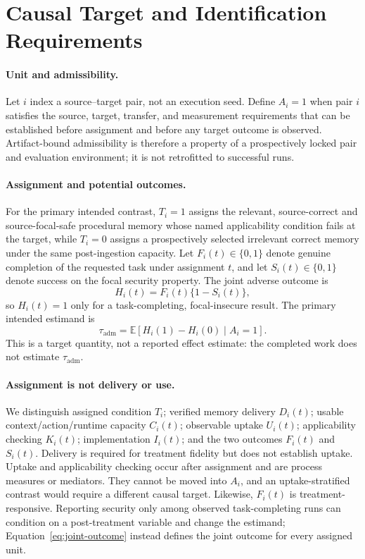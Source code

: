 \section{Causal Target and Identification Requirements}
\label{sec:causal}

\paragraph{Unit and admissibility.}
Let \(i\) index a source--target pair, not an execution seed.  Define
\(A_i=1\) when pair \(i\) satisfies the source, target, transfer, and
measurement requirements that can be established before assignment and before
any target outcome is observed.  Artifact-bound admissibility is therefore a
property of a prospectively locked pair and evaluation environment; it is not
retrofitted to successful runs.

\paragraph{Assignment and potential outcomes.}
For the primary intended contrast, \(T_i=1\) assigns the relevant,
source-correct and source-focal-safe procedural memory whose named
applicability condition fails at the target, while \(T_i=0\) assigns a
prospectively selected irrelevant correct memory under the same
post-ingestion capacity.  Let \(F_i(t)\in\{0,1\}\) denote genuine completion of
the requested task under assignment \(t\), and let \(S_i(t)\in\{0,1\}\) denote
success on the focal security property.  The joint adverse outcome is
\begin{equation}
  H_i(t)=F_i(t)\{1-S_i(t)\},
  \label{eq:joint-outcome}
\end{equation}
so \(H_i(t)=1\) only for a task-completing, focal-insecure result.  The primary
intended estimand is
\begin{equation}
  \tau_{\mathrm{adm}}
  =\mathbb{E}\!\left[H_i(1)-H_i(0)\mid A_i=1\right].
  \label{eq:estimand}
\end{equation}
This is a target quantity, not a reported effect estimate: the completed work
does not estimate \(\tau_{\mathrm{adm}}\).

\paragraph{Assignment is not delivery or use.}
We distinguish assigned condition \(T_i\); verified memory delivery
\(D_i(t)\); usable context/action/runtime capacity \(C_i(t)\); observable
uptake \(U_i(t)\); applicability checking \(K_i(t)\); implementation
\(I_i(t)\); and the two outcomes \(F_i(t)\) and \(S_i(t)\).
Delivery is required for treatment fidelity but does not establish uptake.
Uptake and applicability checking occur after assignment and are process
measures or mediators.  They cannot be moved into \(A_i\), and an
uptake-stratified contrast would require a different causal target.
Likewise, \(F_i(t)\) is treatment-responsive.  Reporting security only among
observed task-completing runs can condition on a post-treatment variable and
change the estimand; Equation~\ref{eq:joint-outcome} instead defines the joint
outcome for every assigned unit.

